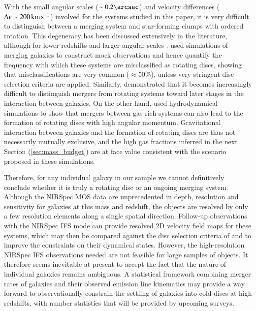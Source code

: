 \documentclass[longauth]{aa}
\newcommand{\kms}{\rm km\,s^{-1}}
\begin{document}
With the small angular scales ($\sim0.2\arcsec$) and velocity differences ($\Delta v\sim 200\,\kms$) involved for the systems studied in this paper, it is very difficult to distinguish between a merging system and star-forming clumps with ordered rotation. This degeneracy has been discussed extensively in the literature, although for lower redshifts and larger angular scales \citep[e.g.,][]{Krajnovic2006,Shapiro2008,Wisnioski2015,Rodrigues2017}. \citet{Simons2019} used simulations of merging galaxies to construct mock observations and hence quantify the frequency with which these systems are misclassified as rotating discs, showing that misclassifications are very common ($\approx50\%$), unless very stringent disc selection criteria are applied. Similarly, \citet{Hung2015,Hung2016} demonstrated that it becomes increasingly difficult to distinguish mergers from rotating systems toward later stages in the interaction between galaxies. On the other hand, \citet{Robertson2006} used hydrodynamical simulations to show that mergers between gas-rich systems can also lead to the formation of rotating discs with high angular momentum. Gravitational interaction between galaxies and the formation of rotating discs are thus not necessarily mutually exclusive, and the high gas fractions inferred in the next Section (\ref{sec:mass_budget}) are at face value consistent with the scenario proposed in these simulations.

Therefore, for any individual galaxy in our sample we cannot definitively conclude whether it is truly a rotating disc or an ongoing merging system. Although the NIRSpec MOS data are unprecedented in depth, resolution and sensitivity for galaxies at this mass and redshift, the objects are resolved by only a few resolution elements along a single spatial direction. Follow-up observations with the NIRSpec IFS mode can provide resolved 2D velocity field maps for these systems, which may then be compared against the disc selection criteria of \citet{Wisnioski2015} and \citet{Simons2019} to improve the constraints on their dynamical states.
However, the high-resolution NIRSpec IFS observations needed are not feasible for large samples of objects. It therefore seems inevitable at present to accept the fact that the nature of individual galaxies remains ambiguous. A statistical framework combining merger rates of galaxies and their observed emission line kinematics may provide a way forward to observationally constrain the settling of galaxies into cold discs at high redshifts, with number statistics that will be provided by upcoming surveys. 
\end{document}
